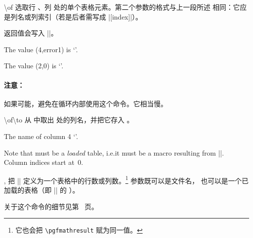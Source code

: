 \documentclass[a4paper,doc2]{ltxdoc}
\begin{document}
\begin{command}{\pgfplotstablegetelem{}\textbackslash of}
    选取行 、列  处的单个表格元素。第二个参数的格式与上一段所述
    相同：它应是列名或列索引（若是后者需写成 |[index]|）。

    返回值会写入 |\pgfplotsretval|。
\begin{codeexample}[]
\of{\loadedtable}
The value (4,error1) is `\pgfplotsretval'.

\of{\loadedtable}
The value (2,0) is `\pgfplotsretval'.
\end{codeexample}

    \paragraph{注意：}

    如果可能，避免在循环内部使用这个命令。它相当慢。
\end{command}

\begin{command}{\pgfplotstablegetcolumnnamebyindex{}\textbackslash of\textbackslash to}
    从  中取出  处的列名，并把它存入 。
\begin{codeexample}[]
\of{\loadedtable}\to\pgfplotsretval
The name of column 4 `\pgfplotsretval'.
\end{codeexample}
    \noindent Note that  must be a \emph{loaded} table, i.e.\@ it
    must be a macro resulting from |\pgfplotstableread|. Column indices start
    at~$0$.
\end{command}

\begin{commandlist}{%
    \pgfplotstablegetrowsof{},
    \pgfplotstablegetcolsof{}%
}
    把 |\pgfplotsretval| 定义为一个表格中的行数或列数。\footnote{它也会把
    \texttt{\textbackslash pgfmathresult} 赋为同一值。} 参数既可以是文件名，
    也可以是一个已加载的表格（即 |\pgfplotstableread| 的 ）。
\end{commandlist}

\begin{command}{\pgfplotstablevertcat{}}
    关于这个命令的细节见第~\pageref{table:vertcat} 页。
\end{command}
\end{document}
